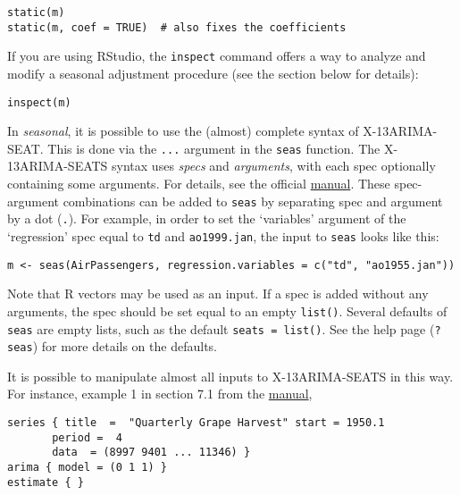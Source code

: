 \begin{verbatim}
static(m)
static(m, coef = TRUE)  # also fixes the coefficients
\end{verbatim}

If you are using RStudio, the \texttt{inspect} command offers a way to
analyze and modify a seasonal adjustment procedure (see the section
below for details):

\begin{verbatim}
inspect(m)
\end{verbatim}


In \emph{seasonal}, it is possible to use the (almost) complete syntax
of X-13ARIMA-SEAT. This is done via the \texttt{...} argument in the
\texttt{seas} function. The X-13ARIMA-SEATS syntax uses \emph{specs} and
\emph{arguments}, with each spec optionally containing some arguments.
For details, see the official
\href{http://www.census.gov/ts/x13as/docX13AS.pdf}{manual}. These
spec-argument combinations can be added to \texttt{seas} by separating
spec and argument by a dot (\texttt{.}). For example, in order to set
the `variables' argument of the `regression' spec equal to \texttt{td}
and \texttt{ao1999.jan}, the input to \texttt{seas} looks like this:

\begin{verbatim}
m <- seas(AirPassengers, regression.variables = c("td", "ao1955.jan"))
\end{verbatim}

Note that R vectors may be used as an input. If a spec is added without
any arguments, the spec should be set equal to an empty \texttt{list()}.
Several defaults of \texttt{seas} are empty lists, such as the default
\texttt{seats = list()}. See the help page (\texttt{?seas}) for more
details on the defaults.

It is possible to manipulate almost all inputs to X-13ARIMA-SEATS in
this way. For instance, example 1 in section 7.1 from the
\href{http://www.census.gov/ts/x13as/docX13AS.pdf}{manual},

\begin{verbatim}
series { title  =  "Quarterly Grape Harvest" start = 1950.1
       period =  4
       data  = (8997 9401 ... 11346) }
arima { model = (0 1 1) }
estimate { }
\end{verbatim}


